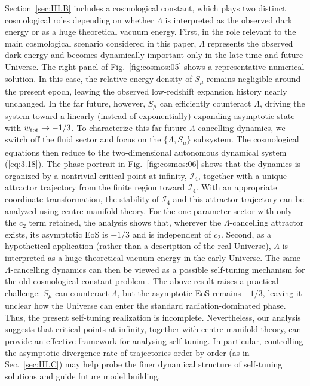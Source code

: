 \documentclass[aps,prd,twocolumn]{revtex4-2}
\newcommand\subtot{{\rm tot}}
\begin{document}
Section~\ref{sec:III.B} includes a cosmological constant, which plays two distinct cosmological roles depending on whether $\Lambda$ is interpreted as the observed dark energy or as a huge theoretical vacuum energy. First, in the role relevant to the main cosmological scenario considered in this paper, $\Lambda$ represents the observed dark energy and becomes dynamically important only in the late-time and future Universe. The right panel of Fig.~\ref{fig:cosmos:05} shows a representative numerical solution. In this case, the relative energy density of $S_\mu$ remains negligible around the present epoch, leaving the observed low-redshift expansion history nearly unchanged. In the far future, however, $S_\mu$ can efficiently counteract $\Lambda$, driving the system toward a linearly (instead of exponentially) expanding asymptotic state with $w_\subtot\rightarrow -1/3$. To characterize this far-future $\Lambda$-cancelling dynamics, we switch off the fluid sector and focus on the $\{\Lambda,S_\mu\}$ subsystem. The cosmological equations then reduce to the two-dimensional autonomous dynamical system (\ref{eq:3.18}). The phase portrait in Fig.~\ref{fig:cosmos:06} shows that the dynamics is organized by a nontrivial critical point at infinity, $\mathcal{I}_4$, together with a unique attractor trajectory from the finite region toward $\mathcal{I}_4$. With an appropriate coordinate transformation, the stability of $\mathcal{I}_4$ and this attractor trajectory can be analyzed using centre manifold theory. For the one-parameter sector with only the $c_2$ term retained, the analysis shows that, wherever the $\Lambda$-cancelling attractor exists, its asymptotic EoS is $-1/3$ and is independent of $c_2$. Second, as a hypothetical application (rather than a description of the real Universe), $\Lambda$ is interpreted as a huge theoretical vacuum energy in the early Universe. The same $\Lambda$-cancelling dynamics can then be viewed as a possible self-tuning mechanism for the old cosmological constant problem \cite{Dolgov1985.JETPLett.41.345,Ford1987.PRD.35.2339,Charmousis2012.PRL.108.051101}. The above result raises a practical challenge: $S_\mu$ can counteract $\Lambda$, but the asymptotic EoS remains $-1/3$, leaving it unclear how the Universe can enter the standard radiation-dominated phase. Thus, the present self-tuning realization is incomplete. Nevertheless, our analysis suggests that critical points at infinity, together with centre manifold theory, can provide an effective framework for analysing self-tuning. In particular, controlling the asymptotic divergence rate of trajectories order by order (as in Sec.~\ref{sec:III.C}) may help probe the finer dynamical structure of self-tuning solutions and guide future model building.
\end{document}
